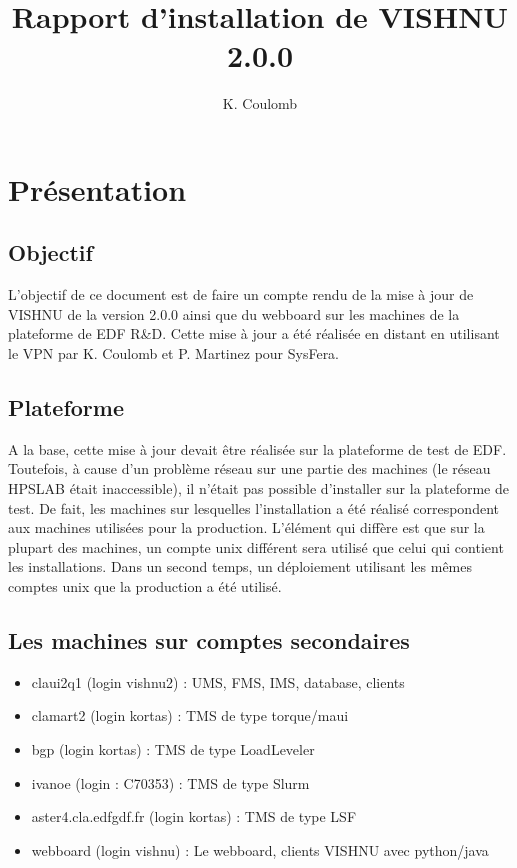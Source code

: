 \documentclass{article}
\title{Rapport d'installation de VISHNU 2.0.0}
\author{K. Coulomb}
\begin{document}
\frontmatter %
\maketitle %
\tableofcontents %
\mainmatter %





\section{Pr\'esentation}
    
\subsection{Objectif}
L'objectif de ce document est de faire un compte rendu de la mise à
jour de VISHNU de la version 2.0.0 ainsi que du webboard sur les machines
de la plateforme de EDF R\&D. Cette mise à jour a été 
réalisée en distant en utilisant le VPN par K. Coulomb et P. Martinez pour SysFera.

\subsection{Plateforme}
A la base, cette mise à jour devait \^etre r\'ealis\'ee sur la 
plateforme de test de EDF. Toutefois, \`a cause d'un probl\`eme
r\'eseau sur une partie des machines (le r\'eseau HPSLAB \'etait
inaccessible), il n'\'etait pas possible d'installer sur la
plateforme de test. De fait, les machines sur lesquelles l'installation
a \'et\'e r\'ealis\'e correspondent aux machines utilis\'ees pour
la production. L'\'el\'ement qui diff\`ere est que sur la plupart
des machines, un compte unix diff\'erent sera utilis\'e que celui
qui contient les installations. Dans un second temps, un déploiement
utilisant les m\^emes comptes unix que la production a \'et\'e 
utilis\'e.

\subsection{Les machines sur comptes secondaires}
\begin{itemize}
\item claui2q1 (login vishnu2) : UMS, FMS, IMS, database, clients
\item clamart2 (login kortas) : TMS de type torque/maui
\item bgp (login kortas) : TMS de type LoadLeveler
\item ivanoe (login : C70353) : TMS de type  Slurm
\item aster4.cla.edfgdf.fr (login kortas) : TMS de type  LSF
\item webboard (login vishnu) : Le webboard, clients VISHNU avec python/java
\end{itemize}
\end{document}
